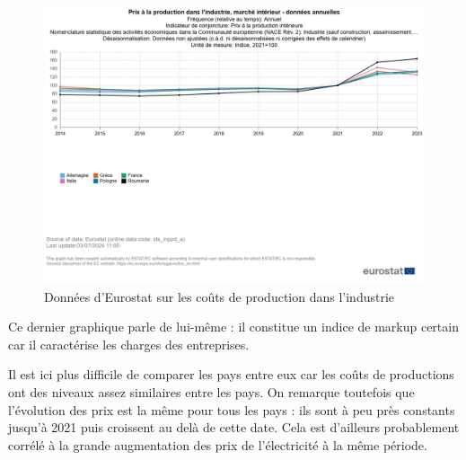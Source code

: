\documentclass{article}
\begin{document}
\begin{figure}[H]
  \centering
  \begin{minipage}{0.8\textwidth}
      \centering
      \includegraphics[width=\textwidth]{"prix_prod.png"}
      \caption{Données d'Eurostat sur les coûts de production dans l'industrie}
  \end{minipage}
\end{figure}
\vspace{0.5cm}

Ce dernier graphique parle de lui-même : il constitue un indice de markup certain car il caractérise les charges des entreprises.

Il est ici plus difficile de comparer les pays entre eux car les coûts de productions ont des niveaux assez similaires entre les pays. On remarque toutefois que l'évolution des prix est la même pour tous les pays : ils sont à peu près constants jusqu'à 2021 puis croissent au delà de cette date. Cela est d'ailleurs probablement corrélé à la grande augmentation des prix de l'électricité à la même période.



\clearpage
\end{document}
